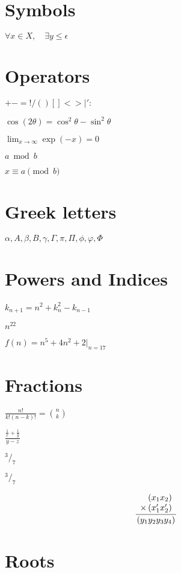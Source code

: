 \documentclass{article}
\begin{document}
\section{Symbols}
$\forall x \in X, \quad \exists y \leq \epsilon$

\section{Operators}
$+ - = ! / ( ) [ ] < > | ' :$

$\cos (2\theta) = \cos^2 \theta - \sin^2 \theta$

$\lim_{x \to \infty} \exp(-x) = 0$

$a \bmod b$

$x \equiv a \pmod b$


\section{Greek letters}
$\alpha, A, \beta, B, \gamma, \Gamma, \pi, \Pi, \phi, \varphi, \Phi$

\section{Powers and Indices}

$k_{n+1} = n^2 + k_n^2 - k_{n-1}$

$n^{22}$

$f(n) = n^5 + 4n^2 + 2 |_{n=17}$


\section{Fractions}

$\frac{n!}{k!(n-k)!} = \binom{n}{k}$



$\frac{\frac{1}{x}+\frac{1}{y}}{y-z}$



$^3/_7$

$\newcommand*\rfrac[2]{{}^{#1}\!/_{#2}}
\rfrac{3}{7}$


\begin{equation}
\frac{
    \begin{array}[b]{r}
      \left( x_1 x_2 \right)\\
      \times \left( x'_1 x'_2 \right)
    \end{array}
  }{
    \left( y_1y_2y_3y_4 \right)
  }
\end{equation}


\section{Roots}
\end{document}
